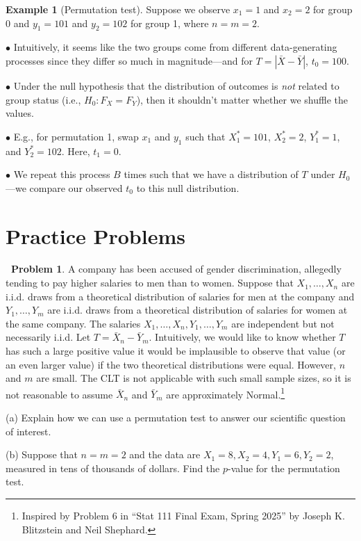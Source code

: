 \documentclass[12pt,oneside]{article}
\theoremstyle{definition}
\newtheorem{example}{Example}
\newtheorem{problem}{\faPen \ Problem}
\theoremstyle{remark}
\begin{document}
\begin{example}[Permutation test]
Suppose we observe $x_1 = 1$ and $x_2 = 2$ for group 0 and $y_1 = 101$ and $y_2 = 102$ for group 1, where $n = m = 2$.

$\bullet$ Intuitively, it seems like the two groups come from different data-generating processes since they differ so much in magnitude—and for $T = |\bar{X} - \bar{Y}|$, $t_0 = 100$.

$\bullet$ Under the null hypothesis that the distribution of outcomes is \textit{not} related to group status (i.e., $H_0: F_X = F_Y$), then it shouldn't matter whether we shuffle the values.

$\bullet$ E.g., for permutation 1, swap $x_1$ and $y_1$ such that $X_1^* = 101$, $X_2^* = 2$, $Y_1^* = 1$, and $Y_2^* = 102$. Here, $t_1 = 0$.

$\bullet$ We repeat this process $B$ times such that we have a distribution of $T$ under $H_0$—we compare our observed $t_0$ to this null distribution.
\end{example}

\section{Practice Problems}

\begin{problem}
A company has been accused of gender discrimination, allegedly tending to pay higher salaries to men than to women. Suppose that $X_1, \ldots, X_n$ are i.i.d. draws from a theoretical distribution of salaries for men at the company and $Y_1, \ldots, Y_m$ are i.i.d. draws from a theoretical distribution of salaries for women at the same company. The salaries $X_1, \ldots, X_n, Y_1, \ldots, Y_m$ are independent but not necessarily i.i.d. Let $T = \bar{X}_n - \bar{Y}_m$. Intuitively, we would like to know whether $T$ has such a large positive value it would be implausible to observe that value (or an even larger value) if the two theoretical distributions were equal. However, $n$ and $m$ are small. The CLT is not applicable with such small sample sizes, so it is not reasonable to assume $\bar{X}_n$ and $\bar{Y}_m$ are approximately Normal.\footnote{Inspired by Problem 6 in \enquote{Stat 111 Final Exam, Spring 2025} by Joseph K. Blitzstein and Neil Shephard.}

(a) Explain how we can use a permutation test to answer our scientific question of interest.

(b) Suppose that $n = m = 2$ and the data are $X_1 = 8, X_2 = 4, Y_1 = 6, Y_2 = 2$, measured in tens of thousands of dollars. Find the $p$-value for the permutation test.
\end{problem}
\end{document}
